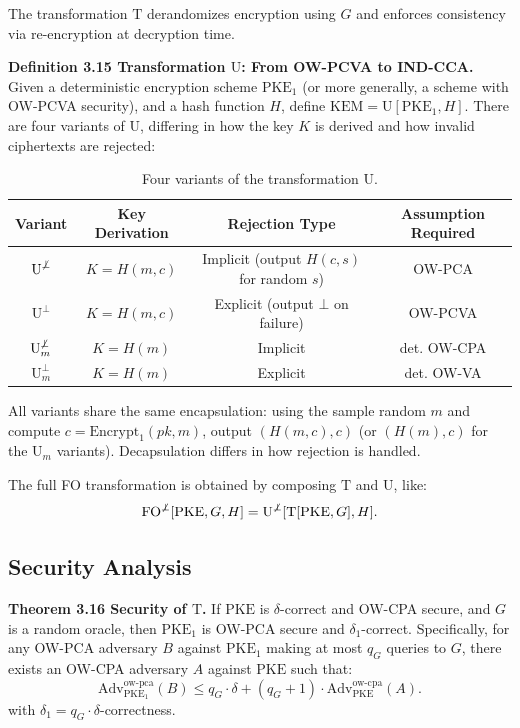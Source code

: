 The transformation $\text{T}$ derandomizes encryption using $G$ and enforces consistency via re-encryption at decryption time.

\noindent\textbf{Definition 3.15 Transformation $\text{U}$: From OW-PCVA to IND-CCA.} Given a deterministic encryption scheme $\text{PKE}_1$ (or more generally, a scheme with OW-PCVA security), and a hash function $H$, define $\text{KEM} = \text{U}[\text{PKE}_1, H]$. There are four variants of $\text{U}$, differing in how the key $K$ is derived and how invalid ciphertexts are rejected:

\begin{table}[htbp]
    \centering
    \caption{Four variants of the transformation $\text{U}$.}
    \label{tab:transformation-U-variants}
    \begin{tabular}{c c c c}
        \toprule
        \textbf{Variant} & \textbf{Key Derivation} & \textbf{Rejection Type} & \textbf{Assumption Required} \\
        \midrule
        $\text{U}^{\not\bot}$ & $K = H(m, c)$ & Implicit (output $H(c, s)$ for random $s$) & OW-PCA \\
        $\text{U}^{\bot}$ & $K = H(m, c)$ & Explicit (output $\bot$ on failure) & OW-PCVA \\
        $\text{U}_m^{\not\bot}$ & $K = H(m)$ & Implicit & det. OW-CPA \\
        $\text{U}_m^{\bot}$ & $K = H(m)$ & Explicit & det. OW-VA \\
        \bottomrule
    \end{tabular}
\end{table}


All variants share the same encapsulation: using the sample random $m$ and compute $c = \text{Encrypt}_1(pk, m)$, output $(H(m, c), c)$ (or $(H(m), c)$ for the $\text{U}_m$ variants). Decapsulation differs in how rejection is handled.

The full FO transformation is obtained by composing $\text{T}$ and $\text{U}$, like:
$$
\text{FO}^{\not\bot}[\text{PKE}, G, H] = \text{U}^{\not\bot}[\text{T}[\text{PKE}, G], H].
$$

\subsection{Security Analysis}

\noindent\textbf{Theorem 3.16 Security of $\text{T}$.} If $\text{PKE}$ is $\delta$-correct and OW-CPA secure, and $G$ is a random oracle, then $\text{PKE}_1$ is OW-PCA secure and $\delta_1$-correct. Specifically, for any OW-PCA adversary $B$ against $\text{PKE}_1$ making at most $q_G$ queries to $G$, there exists an OW-CPA adversary $A$ against $\text{PKE}$ such that:
$$
\text{Adv}_{\text{PKE}_1}^{\text{ow-pca}}(B) \le q_G \cdot \delta + (q_G + 1) \cdot \text{Adv}_{\text{PKE}}^{\text{ow-cpa}}(A).
$$
with $\delta_1=q_G \cdot \delta$-correctness.

